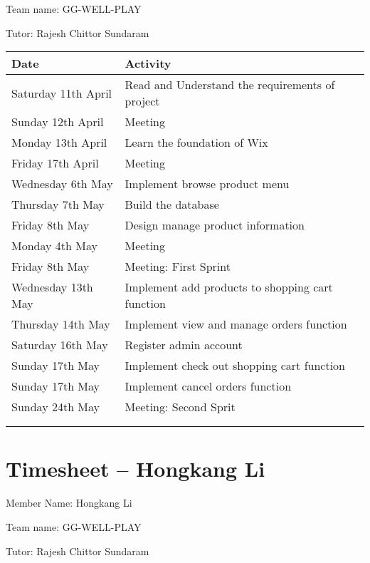 Team name: GG-WELL-PLAY

Tutor: Rajesh Chittor Sundaram

\begin{tabularx}{0.95\linewidth}{%
	l%
	>{\raggedright\arraybackslash}X}%
	\toprule
	Date & Activity\\
	\midrule
	Saturday 11th April & Read and Understand the requirements of project\\
	\midrule
	Sunday 12th April & Meeting\\
	\midrule
	Monday 13th April & Learn the foundation of Wix\\
	\midrule
	Friday 17th April & Meeting\\
	\midrule
	Wednesday 6th May & Implement browse product menu\\
	\midrule
	Thursday 7th May & Build the database \\
	\midrule
	Friday 8th May & Design manage product information \\
	\midrule
	Monday 4th May & Meeting\\
	\midrule
	Friday 8th May & Meeting: First Sprint\\
	\midrule
	Wednesday 13th May & Implement add products to shopping cart function\\
	\midrule
	Thursday 14th May & Implement view and manage orders function\\
	\midrule
	Saturday 16th May & Register admin account\\
	\midrule
	Sunday 17th May & Implement check out shopping cart function\\
	\midrule
	Sunday 17th May & Implement cancel orders function\\
	\midrule
	Sunday 24th May & Meeting: Second Sprit\\
	\bottomrule
	\\
	\caption{Timesheet -- Chongjing Zhang}  
  \label{tab:timesheetChongjing}
\end{tabularx}

\clearpage
\section*{Timesheet – Hongkang Li}
Member Name: Hongkang Li

Team name: GG-WELL-PLAY

Tutor: Rajesh Chittor Sundaram

